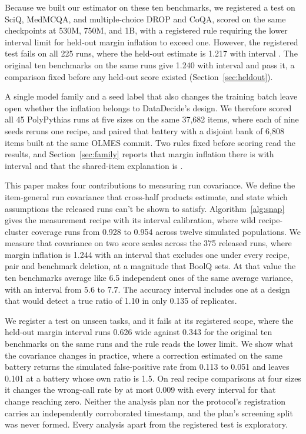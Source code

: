 Because we built our estimator on these ten benchmarks, we registered a test on SciQ, MedMCQA, and multiple-choice DROP and CoQA, scored on the same checkpoints at 530M, 750M, and 1B, with a registered rule requiring the lower interval limit for held-out margin inflation to exceed one. However, the registered test fails on all 225 runs, where the held-out estimate is 1.217 with interval . The original ten benchmarks on the same runs give 1.240 with interval  and pass it, a comparison fixed before any held-out score existed (Section~\ref{sec:heldout}).

A single model family and a seed label that also changes the training batch leave open whether the inflation belongs to DataDecide's design. We therefore scored all 45 PolyPythias runs at five sizes on the same 37,682 items, where each of nine seeds reruns one recipe, and paired that battery with a disjoint bank of 6,808 items built at the same OLMES commit. Two rules fixed before scoring read the results, and Section~\ref{sec:family} reports that margin inflation there is  with interval  and that the shared-item explanation is .

This paper makes four contributions to measuring run covariance. We define the item-general run covariance that cross-half products estimate, and state which assumptions the released runs can't be shown to satisfy. Algorithm~\ref{alg:snap} gives the measurement recipe with its interval calibration, where wild recipe-cluster coverage runs from 0.928 to 0.954 across twelve simulated populations. We measure that covariance on two score scales across the 375 released runs, where margin inflation is 1.244 with an interval that excludes one under every recipe, pair and benchmark deletion, at a magnitude that BoolQ sets. At that value the ten benchmarks average like 6.5 independent ones of the same average variance, with an interval from 5.6 to 7.7. The accuracy interval includes one at a design that would detect a true ratio of 1.10 in only 0.135 of replicates.

We register a test on unseen tasks, and it fails at its registered scope, where the held-out margin interval runs 0.626 wide against 0.343 for the original ten benchmarks on the same runs and the rule reads the lower limit. We show what the covariance changes in practice, where a correction estimated on the same battery returns the simulated false-positive rate from 0.113 to 0.051 and leaves 0.101 at a battery whose own ratio is 1.5. On real recipe comparisons at four sizes it changes the wrong-call rate by at most 0.009 with every interval for that change reaching zero. Neither the analysis plan nor the protocol's registration carries an independently corroborated timestamp, and the plan's screening split was never formed. Every analysis apart from the registered test is exploratory.

